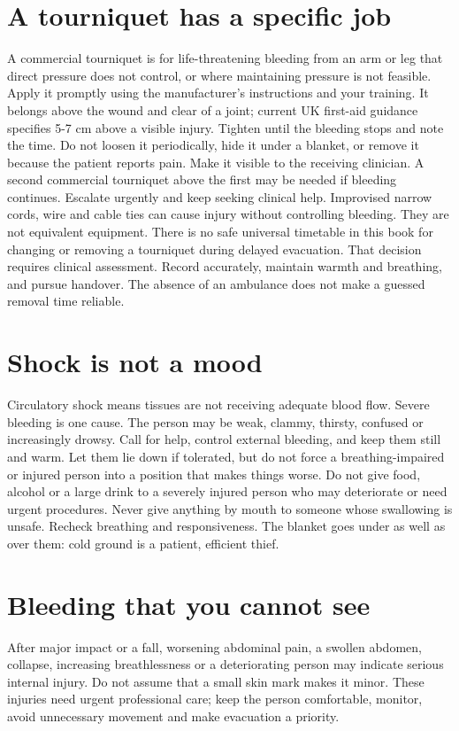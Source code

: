 \documentclass[10pt,openright]{book}
\begin{document}
\section*{A tourniquet has a specific job}
A commercial tourniquet is for life-threatening bleeding from an arm or leg that direct pressure does not control, or where maintaining pressure is not feasible. Apply it promptly using the manufacturer's instructions and your training. It belongs above the wound and clear of a joint; current UK first-aid guidance specifies 5-7 cm above a visible injury. Tighten until the bleeding stops and note the time. Do not loosen it periodically, hide it under a blanket, or remove it because the patient reports pain. Make it visible to the receiving clinician. A second commercial tourniquet above the first may be needed if bleeding continues. Escalate urgently and keep seeking clinical help. Improvised narrow cords, wire and cable ties can cause injury without controlling bleeding. They are not equivalent equipment. There is no safe universal timetable in this book for changing or removing a tourniquet during delayed evacuation. That decision requires clinical assessment. Record accurately, maintain warmth and breathing, and pursue handover. The absence of an ambulance does not make a guessed removal time reliable.

\section*{Shock is not a mood}
Circulatory shock means tissues are not receiving adequate blood flow. Severe bleeding is one cause. The person may be weak, clammy, thirsty, confused or increasingly drowsy. Call for help, control external bleeding, and keep them still and warm. Let them lie down if tolerated, but do not force a breathing-impaired or injured person into a position that makes things worse. Do not give food, alcohol or a large drink to a severely injured person who may deteriorate or need urgent procedures. Never give anything by mouth to someone whose swallowing is unsafe. Recheck breathing and responsiveness. The blanket goes under as well as over them: cold ground is a patient, efficient thief.

\section*{Bleeding that you cannot see}
After major impact or a fall, worsening abdominal pain, a swollen abdomen, collapse, increasing breathlessness or a deteriorating person may indicate serious internal injury. Do not assume that a small skin mark makes it minor. These injuries need urgent professional care; keep the person comfortable, monitor, avoid unnecessary movement and make evacuation a priority.
\end{document}
